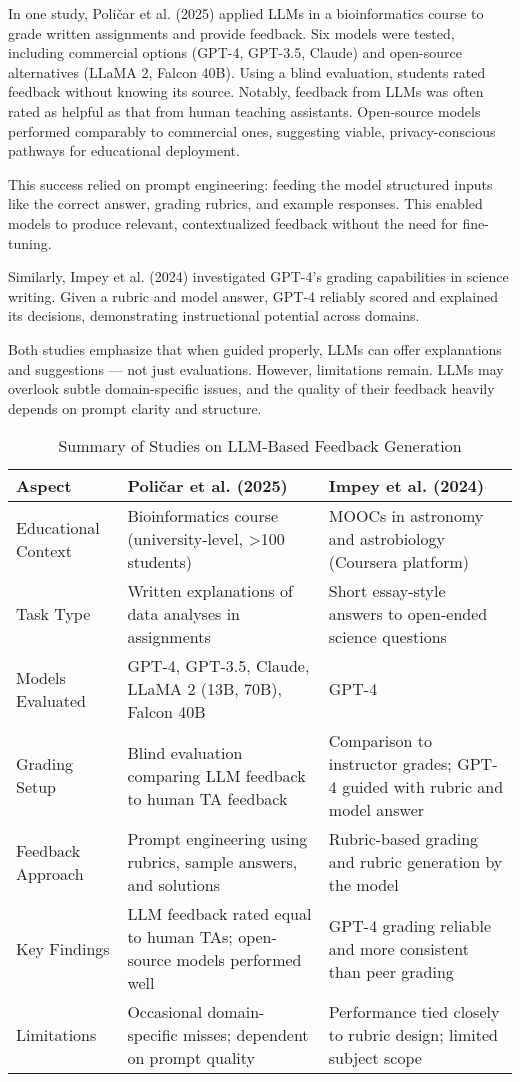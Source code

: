\documentclass[a4paper,twoside,12pt]{report}
\begin{document}
  In one study, Poličar et al. (2025) applied LLMs in a bioinformatics course to grade written assignments and provide feedback. Six models were tested, including commercial options (GPT-4, GPT-3.5, Claude) and open-source alternatives (LLaMA 2, Falcon 40B). Using a blind evaluation, students rated feedback without knowing its source. Notably, feedback from LLMs was often rated as helpful as that from human teaching assistants. Open-source models performed comparably to commercial ones, suggesting viable, privacy-conscious pathways for educational deployment.
  
  This success relied on prompt engineering: feeding the model structured inputs like the correct answer, grading rubrics, and example responses. This enabled models to produce relevant, contextualized feedback without the need for fine-tuning.
  
  Similarly, Impey et al. (2024) investigated GPT-4's grading capabilities in science writing. Given a rubric and model answer, GPT-4 reliably scored and explained its decisions, demonstrating instructional potential across domains.
  
  Both studies emphasize that when guided properly, LLMs can offer explanations and suggestions — not just evaluations. However, limitations remain. LLMs may overlook subtle domain-specific issues, and the quality of their feedback heavily depends on prompt clarity and structure.

  \begin{table}[h!]
    \centering
    \begin{tabular}{|p{3.5cm}|p{6.5cm}|p{6.5cm}|}
    \hline
    \textbf{Aspect} & \textbf{Poličar et al. (2025)} & \textbf{Impey et al. (2024)} \\
    \hline
    Educational Context & Bioinformatics course (university-level, >100 students) & MOOCs in astronomy and astrobiology (Coursera platform) \\
    \hline
    Task Type & Written explanations of data analyses in assignments & Short essay-style answers to open-ended science questions \\
    \hline
    Models Evaluated & GPT-4, GPT-3.5, Claude, LLaMA 2 (13B, 70B), Falcon 40B & GPT-4 \\
    \hline
    Grading Setup & Blind evaluation comparing LLM feedback to human TA feedback & Comparison to instructor grades; GPT-4 guided with rubric and model answer \\
    \hline
    Feedback Approach & Prompt engineering using rubrics, sample answers, and solutions & Rubric-based grading and rubric generation by the model \\
    \hline
    Key Findings & LLM feedback rated equal to human TAs; open-source models performed well & GPT-4 grading reliable and more consistent than peer grading \\
    \hline
    Limitations & Occasional domain-specific misses; dependent on prompt quality & Performance tied closely to rubric design; limited subject scope \\
    \hline
    \end{tabular}
    \caption{Summary of Studies on LLM-Based Feedback Generation}
    \label{tab:llm_feedback_studies}
    \end{table}
\end{document}
